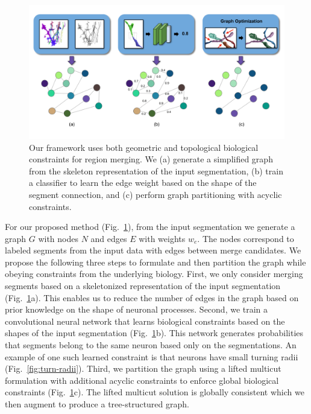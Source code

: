 \begin{figure}[t!]
	\centering
	\includegraphics[width=0.65\linewidth]{./figures/teaser_v4.png}
	\caption{Our framework uses both geometric and topological biological constraints for region merging. We (a) generate a simplified graph from the skeleton representation of the input segmentation, (b) train a classifier to learn the edge weight based on the shape of the segment connection, and (c) perform graph partitioning with acyclic constraints.}
	\label{fig:teaser_pipeline}
\end{figure}


For our proposed method (Fig.~\ref{fig:teaser_pipeline}), from the input segmentation we generate a graph $G$ with nodes $N$ and edges $E$ with weights $w_e$. 
The nodes correspond to labeled segments from the input data with edges between merge candidates.
We propose the following three steps to formulate and then partition the graph while obeying constraints from the underlying biology.
First, we only consider merging segments based on a skeletonized representation of the input segmentation (Fig.~\ref{fig:teaser_pipeline}a).
This enables us to reduce the number of edges in the graph based on prior knowledge on the shape of neuronal processes.
Second, we train a convolutional neural network that learns biological constraints based on the shapes of the input segmentation (Fig.~\ref{fig:teaser_pipeline}b).
This network generates probabilities that segments belong to the same neuron based only on the segmentations. 
An example of one such learned constraint is that neurons have small turning radii (Fig.~\ref{fig:turn-radii}).
Third, we partition the graph using a lifted multicut formulation with additional acyclic constraints to enforce global biological constraints (Fig.~\ref{fig:teaser_pipeline}c).
The lifted multicut solution is globally consistent which we then augment to produce a tree-structured graph.


